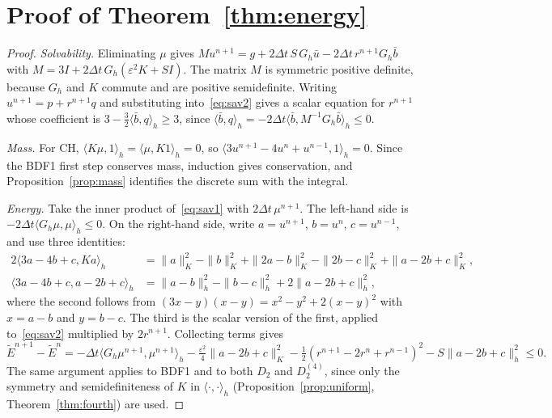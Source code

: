 \documentclass[preprint,12pt]{elsarticle}
\theoremstyle{remark}
\begin{document}
\section{Proof of Theorem~\ref{thm:energy}}\label{app:energy}
\begin{proof}
\emph{Solvability.} Eliminating $\mu$ gives
$Mu^{n+1}=g+2\Delta t\,S\,G_h\bar u-2\Delta t\,r^{n+1}G_h\bar b$ with
$M=3I+2\Delta t\,G_h(\varepsilon^2K+SI)$. The matrix $M$ is symmetric positive definite, because $G_h$ and $K$ commute and are positive semidefinite.
Writing $u^{n+1}=p+r^{n+1}q$ and substituting into~\eqref{eq:sav2} gives a scalar equation for
$r^{n+1}$ whose coefficient is $3-\tfrac32\langle\bar b,q\rangle_h\ge3$, since
$\langle\bar b,q\rangle_h=-2\Delta t\langle\bar b,M^{-1}G_h\bar b\rangle_h\le0$.

\emph{Mass.} For CH, $\langle K\mu,1\rangle_h=\langle\mu,K1\rangle_h=0$, so
$\langle3u^{n+1}-4u^n+u^{n-1},1\rangle_h=0$. Since the BDF1 first step conserves mass, induction
gives conservation, and Proposition~\ref{prop:mass} identifies the discrete sum with the integral.

\emph{Energy.} Take the inner product of~\eqref{eq:sav1} with $2\Delta t\,\mu^{n+1}$. The left-hand side
is $-2\Delta t\langle G_h\mu,\mu\rangle_h\le0$. On the right-hand side, write $a=u^{n+1}$, $b=u^n$,
$c=u^{n-1}$, and use three identities:
\begin{align*}
2\langle3a-4b+c,Ka\rangle_h&=\|a\|_K^2-\|b\|_K^2+\|2a-b\|_K^2-\|2b-c\|_K^2+\|a-2b+c\|_K^2,\\
\langle3a-4b+c,a-2b+c\rangle_h&=\|a-b\|_h^2-\|b-c\|_h^2+2\|a-2b+c\|_h^2,
\end{align*}
where the second follows from $(3x-y)(x-y)=x^2-y^2+2(x-y)^2$ with $x=a-b$ and $y=b-c$. The third is
the scalar version of the first, applied to~\eqref{eq:sav2} multiplied by $2r^{n+1}$. Collecting
terms gives
\[
\tilde E^{n+1}-\tilde E^n=-\Delta t\langle G_h\mu^{n+1},\mu^{n+1}\rangle_h-\tfrac{\varepsilon^2}{4}\|a-2b+c\|_K^2
-\tfrac12(r^{n+1}-2r^n+r^{n-1})^2-S\|a-2b+c\|_h^2\le0.
\]
The same argument applies to BDF1 and to both $D_2$ and $D_2^{(4)}$, since only the symmetry and
semidefiniteness of $K$ in $\langle\cdot,\cdot\rangle_h$ (Proposition~\ref{prop:uniform},
Theorem~\ref{thm:fourth}) are used.
\end{proof}
\end{document}
